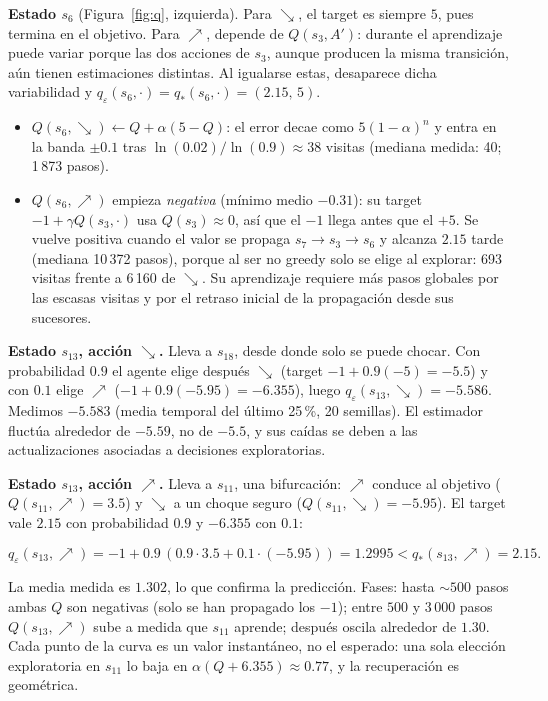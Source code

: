 \documentclass[11pt,a4paper]{article}
\newcommand{\UR}{{\nearrow}}
\newcommand{\DR}{{\searrow}}
\newcommand{\qe}{q_\varepsilon}
\begin{document}
\textbf{Estado $s_6$} (Figura~\ref{fig:q}, izquierda). Para $\DR$, el target es siempre $5$, pues termina en el objetivo. Para $\UR$, depende de $Q(s_3,A')$: durante el aprendizaje puede variar porque las dos acciones de $s_3$, aunque producen la misma transición, aún tienen estimaciones distintas. Al igualarse estas, desaparece dicha variabilidad y $\qe(s_6,\cdot)=q_*(s_6,\cdot)=(2.15,\,5)$.

\begin{itemize}\itemsep0pt

\item $Q(s_6,\DR)\leftarrow Q+\alpha(5-Q)$: el error decae como $5(1-\alpha)^n$ y entra en la banda $\pm0.1$ tras $\ln(0.02)/\ln(0.9)\approx38$ visitas (mediana medida: 40; 1\,873 pasos).

\item $Q(s_6,\UR)$ empieza \emph{negativa} (mínimo medio $-0.31$): su target $-1+\gamma Q(s_3,\cdot)$ usa $Q(s_3)\approx0$, así que el $-1$ llega antes que el $+5$. Se vuelve positiva cuando el valor se propaga $s_7\to s_3\to s_6$ y alcanza $2.15$ tarde (mediana 10\,372 pasos), porque al ser no greedy solo se elige al explorar: 693 visitas frente a 6\,160 de $\DR$. Su aprendizaje requiere más pasos globales por las escasas visitas y por el retraso inicial de la propagación desde sus sucesores.

\end{itemize}



\textbf{Estado $s_{13}$, acción $\DR$.} Lleva a $s_{18}$, desde donde solo se puede chocar. Con probabilidad $0.9$ el agente elige después $\DR$ (target $-1+0.9(-5)=-5.5$) y con $0.1$ elige $\UR$ ($-1+0.9(-5.95)=-6.355$), luego $\qe(s_{13},\DR)=-5.586$. Medimos $-5.583$ (media temporal del último 25\,\%, 20 semillas). El estimador fluctúa alrededor de $-5.59$, no de $-5.5$, y sus caídas se deben a las actualizaciones asociadas a decisiones exploratorias.



\textbf{Estado $s_{13}$, acción $\UR$.} Lleva a $s_{11}$, una bifurcación: $\UR$ conduce al objetivo ($Q(s_{11},\UR)=3.5$) y $\DR$ a un choque seguro ($Q(s_{11},\DR)=-5.95$). El target vale $2.15$ con probabilidad $0.9$ y $-6.355$ con $0.1$:

\begin{equation}
\qe(s_{13},\UR)=-1+0.9\,(0.9\cdot3.5+0.1\cdot(-5.95))=1.2995<q_*(s_{13},\UR)=2.15 .
\end{equation}

La media medida es $1.302$, lo que confirma la predicción. Fases: hasta $\sim\!500$ pasos ambas $Q$ son negativas (solo se han propagado los $-1$); entre $500$ y $3\,000$ pasos $Q(s_{13},\UR)$ sube a medida que $s_{11}$ aprende; después oscila alrededor de $1.30$. Cada punto de la curva es un valor instantáneo, no el esperado: una sola elección exploratoria en $s_{11}$ lo baja en $\alpha(Q+6.355)\approx0.77$, y la recuperación es geométrica.
\end{document}
